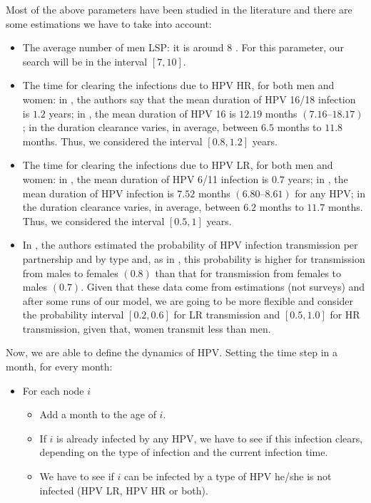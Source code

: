 Most of the above parameters have been studied in the literature and there are some estimations we have to take into account:
\begin{itemize}
	\item The average number of men LSP: it is around $8$ \cite{Durex2002}. For this parameter, our search will be in the interval $[7, 10]$.

	\item The time for clearing the infections due to HPV HR, for both men and women: in \cite{elbasha2007model}, the authors say that the mean duration of HPV 16/18 infection is $1.2$ years; in \cite{Giuliano2011}, the mean duration of HPV 16 is $12.19$  months $(7.16–18.17)$; in \cite{Nyitray2015} the duration clearance varies, in average, between $6.5$ months to $11.8$ months. Thus, we considered the interval $[0.8, 1.2]$ years.
	
	\item The time for clearing the infections due to HPV LR, for both men and women: in \cite{elbasha2007model}, the mean duration of HPV 6/11 infection is $0.7$ years; in \cite{Giuliano2011}, the mean duration of HPV infection is $7.52$ months $(6.80–8.61)$ for any HPV;  in \cite{Nyitray2015} the duration clearance varies, in average, between $6.2$ months to $11.7$ months. Thus, we considered the interval $[0.5, 1]$ years.
	
	\item In \cite{elbasha2007model}, the authors estimated the probability of HPV infection transmission per partnership and by type and, as in \cite{castellsague2012prevalence}, this probability is higher for transmission from males to females $(0.8)$ than that for transmission from females to males $(0.7)$. Given that these data come from estimations (not surveys) and after some runs of our model, we are going to be more flexible and consider the probability interval $[0.2,0.6]$ for LR transmission and $[0.5,1.0]$ for HR transmission, given that, women transmit less than men.
\end{itemize}

Now, we are able to define the dynamics of HPV. Setting the time step in a month, for every month:

\begin{itemize}
	\item  For each node $i$
	\begin{itemize}
		\item Add a month to the age of $i$.
		\item If $i$ is already infected by any HPV, we have to see if this infection clears, depending on the type of infection and the current infection time.
		\item We have to see if $i$ can be infected by a type of HPV he/she is not infected (HPV LR, HPV HR or both).
	\end{itemize}
\end{itemize}

